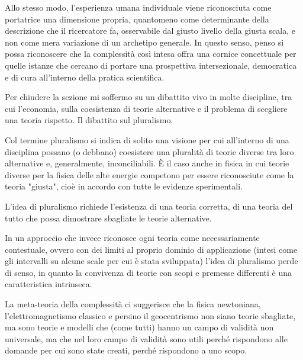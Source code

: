 \documentclass[a4paper, headings=standardclasses]{scrartcl}
\begin{document}
Allo stesso modo, l'esperienza umana individuale viene riconosciuta come portatrice una dimensione propria, quantomeno come determinante della descrizione che il ricercatore fa, osservabile dal giusto livello della giusta scala, e non come mera variazione di un archetipo generale. 
In questo senso, penso si possa riconoscere che la complessità così intesa offra una cornice concettuale per quelle istanze che cercano di portare una prospettiva intersezionale, democratica e di cura all'interno della pratica scientifica.

Per chiudere la sezione mi soffermo su un dibattito vivo in molte discipline, tra cui l'economia, sulla coesistenza di teorie alternative e il problema di scegliere una teoria rispetto. Il dibattito sul pluralismo. 

Col termine pluralismo si indica di solito una visione per cui all'interno di una disciplina possano (o debbano) coesistere una pluralità di teorie diverse tra loro alternative e, generalmente, inconciliabili. 
È il caso anche in fisica in cui teorie diverse per la fisica delle alte energie competono per essere riconosciute come la teoria "giusta", cioè in accordo con tutte le evidenze sperimentali.

L'idea di pluralismo richiede l'esistenza di una teoria corretta, di una teoria del tutto che possa dimostrare sbagliate le teorie alternative.

In un approccio che invece riconosce ogni teoria come necessariamente contestuale, ovvero con dei limiti al proprio dominio di applicazione (intesi come gli intervalli su alcune scale per cui è stata sviluppata) l'idea di pluralismo perde di senso, in quanto la convivenza di teorie con scopi e premesse differenti è una caratteristica intrinseca.

La meta-teoria della complessità ci suggerisce che la fisica newtoniana, l'elettromagnetismo classico e persino il geocentrismo non siano teorie sbagliate, ma sono teorie e modelli che (come tutti) hanno un campo di validità non universale, ma che nel loro campo di validità sono utili perché rispondono alle domande per cui sono state creati, perché rispondono a uno scopo.
\end{document}
